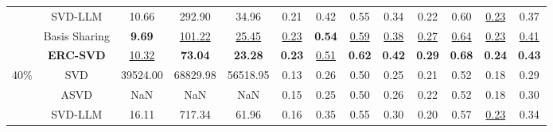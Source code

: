 \begin{table}[t]
{\begin{tabular}{c|c|ccc|cccccccc}
                               & \cellcolor{white} SVD-LLM & \cellcolor{white} 10.66 & \cellcolor{white} 292.90 & \cellcolor{white} 34.96 & \cellcolor{white} 0.21 & \cellcolor{white} 0.42 & \cellcolor{white} 0.55 & \cellcolor{white} 0.34 & \cellcolor{white} 0.22 & \cellcolor{white} 0.60 & \cellcolor{white} \underline{0.23} & \cellcolor{white} 0.37\\

                               & \cellcolor{white} Basis Sharing & \cellcolor{white} \textbf{9.69} & \cellcolor{white} \underline{101.22} & \cellcolor{white} \underline{25.45} & \cellcolor{white} \underline{0.23} & \cellcolor{white} \textbf{0.54} & \cellcolor{white} \underline{0.59} & \cellcolor{white} \underline{0.38} & \cellcolor{white} \underline{0.27} & \cellcolor{white} \underline{0.64} & \cellcolor{white} \underline{0.23} & \cellcolor{white} \underline{0.41} \\
        \cmidrule{2-13}      
                               & \cellcolor{cyan!10} \textbf{ERC-SVD} & \cellcolor{cyan!10} \underline{10.32} & \cellcolor{cyan!10} \textbf{73.04} & \cellcolor{cyan!10} \textbf{23.28} & \cellcolor{cyan!10} \textbf{0.23} & \cellcolor{cyan!10} \underline{0.51} & \cellcolor{cyan!10} \textbf{0.62} & \cellcolor{cyan!10} \textbf{0.42} & \cellcolor{cyan!10} \textbf{0.29} & \cellcolor{cyan!10} \textbf{0.68} & \cellcolor{cyan!10} \textbf{0.24} & \cellcolor{cyan!10} \textbf{0.43} \\
    \midrule
        \multirow{6}{*}{40\%}  & \cellcolor{white} SVD & \cellcolor{white} 39524.00 & \cellcolor{white} 68829.98 & \cellcolor{white} 56518.95 & \cellcolor{white} 0.13 & \cellcolor{white} 0.26 & \cellcolor{white} 0.50 & \cellcolor{white} 0.25 & \cellcolor{white} 0.21 & \cellcolor{white} 0.52 & \cellcolor{white} 0.18 & \cellcolor{white} 0.29\\

                               & \cellcolor{white} ASVD & \cellcolor{white} NaN & \cellcolor{white} NaN & \cellcolor{white} NaN & \cellcolor{white} 0.15 & \cellcolor{white} 0.25 & \cellcolor{white} 0.50 & \cellcolor{white} 0.26 & \cellcolor{white} 0.22 & \cellcolor{white} 0.52 & \cellcolor{white} 0.18 & \cellcolor{white} 0.30\\
        
                               & \cellcolor{white} SVD-LLM & \cellcolor{white} 16.11 & \cellcolor{white} 717.34 & \cellcolor{white} 61.96 & \cellcolor{white} 0.16 & \cellcolor{white} 0.35 & \cellcolor{white} 0.55 & \cellcolor{white} 0.30 & \cellcolor{white} 0.20 & \cellcolor{white} 0.57 & \cellcolor{white} \underline{0.23} & \cellcolor{white} 0.34\\


\end{tabular}}
\end{table}
